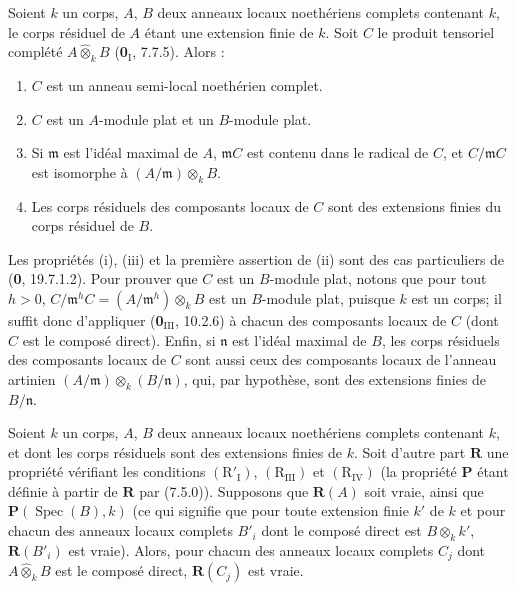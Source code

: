 \begin{lemma}[7.5.5]
\label{IV.2.s7.5.5-fr}
Soient $k$ un corps, $A$, $B$ deux anneaux locaux noethériens complets
contenant $k$, le corps résiduel de $A$ étant une extension finie de $k$. Soit
$C$ le produit tensoriel complété $A\widehat\otimes_k B$
\textup{(\textbf{0}$_{\mathrm I}$, 7.7.5)}. Alors :
\begin{enumerate}
\item[\emph{(i)}] $C$ est un anneau semi-local noethérien complet.
\item[\emph{(ii)}] $C$ est un $A$-module plat et un $B$-module plat.
\item[\emph{(iii)}] Si $\mathfrak m$ est l'idéal maximal de $A$,
$\mathfrak mC$ est contenu dans le radical de $C$, et $C/\mathfrak mC$ est
isomorphe à $(A/\mathfrak m)\otimes_k B$.
\item[\emph{(iv)}] Les corps résiduels des composants locaux de $C$ sont des
extensions finies du corps résiduel de $B$.
\end{enumerate}
\end{lemma}

Les propriétés (i), (iii) et la première assertion de (ii) sont des cas
particuliers de (\textbf{0}, 19.7.1.2). Pour prouver que $C$ est un $B$-module plat,
notons que pour tout $h>0$,
$C/\mathfrak m^hC=(A/\mathfrak m^h)\otimes_k B$
est un $B$-module plat, puisque $k$ est un corps; il suffit donc d'appliquer
(\textbf{0}$_{\mathrm{III}}$, 10.2.6) à chacun des composants locaux de $C$ (dont $C$
est le composé direct). Enfin, si $\mathfrak n$ est l'idéal maximal de $B$, les
corps résiduels des composants locaux de $C$ sont aussi ceux des composants
locaux de l'anneau artinien
$(A/\mathfrak m)\otimes_k(B/\mathfrak n)$, qui, par hypothèse, sont des
extensions finies de $B/\mathfrak n$.

\begin{proposition}[7.5.6]
\label{IV.2.s7.5.6-fr}
Soient $k$ un corps, $A$, $B$ deux anneaux locaux noethériens complets
contenant $k$, et dont les corps résiduels sont des extensions finies de $k$.
Soit d'autre part $\boldsymbol R$ une propriété vérifiant les conditions
$(\mathrm R'_{\mathrm I})$, $(\mathrm R_{\mathrm{III}})$ et
$(\mathrm R_{\mathrm{IV}})$ \textup{(la propriété $\boldsymbol P$ étant définie à
partir de $\boldsymbol R$ par (7.5.0))}. Supposons que $\boldsymbol R(A)$ soit
vraie, ainsi que $\boldsymbol P(\operatorname{Spec}(B),k)$ \textup{(ce qui signifie que
pour toute extension finie $k'$ de $k$ et pour chacun des anneaux locaux
complets $B'_i$ dont le composé direct est $B\otimes_k k'$,
$\boldsymbol R(B'_i)$ est vraie)}. Alors, pour chacun des anneaux locaux complets
$C_j$ dont $A\widehat\otimes_k B$ est le composé direct,
$\boldsymbol R(C_j)$ est vraie.
\end{proposition}

